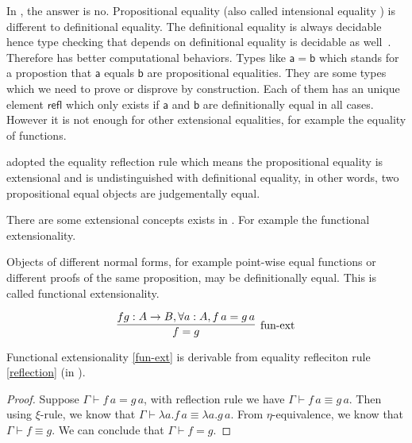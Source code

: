 In \itt, the answer is no. Propositional equality (also called intensional equality  \cite{nor:90}) is different to definitional equality. 
The definitional equality is always decidable hence type checking that depends on definitional equality is
decidable as well~\cite{alti:lics99}. Therefore \itt has better computational behaviors.
Types like $\mathsf{a = b}$ which stands for a
propostion that $\mathsf{a}$ equals $\mathsf{b}$ are propositional equalities. They are some types which we need to prove
or disprove by construction. Each of them has an unique element $\mathsf{refl}$ which only exists if $\mathsf{a}$ and $\mathsf{b}$ are
definitionally equal in all cases. However it is not enough for other extensional equalities, for example the equality of functions.


\ett adopted the equality reflection rule which means the propositional equality is extensional and is undistinguished with definitional equality, in other words, two propositional equal objects are judgementally equal.

There are some extensional concepts exists in \ett. For example the functional extensionality.

\begin{definition}\label{fun-ext}
Objects of different normal forms, for example point-wise equal functions or different proofs of the same proposition, may be definitionally equal. This is called functional extensionality.

\begin{equation}
\infer[\text{fun-ext}]{f = g}{f g : A \rightarrow B, \forall a : A, f \, a = g \, a}
\end{equation}

\end{definition}



\begin{lemma}
\label{functional extensionality is available in ett}
Functional extensionality \ref{fun-ext} is derivable from equality refleciton rule \ref{reflection} (in \ett).
\end{lemma}
 
\begin{proof}
Suppose $\Gamma \vdash f \,a = g \,a$, with reflection rule we have $\Gamma \vdash f \,a \equiv g \,a$.
Then using $\xi$-rule, we know that $\Gamma \vdash \lambda a . f \,a \equiv \lambda a . g \,a$.
From $\eta$-equivalence, we know that $\Gamma \vdash f \equiv g$. We can conclude that $\Gamma \vdash f = g$.
\end{proof}


